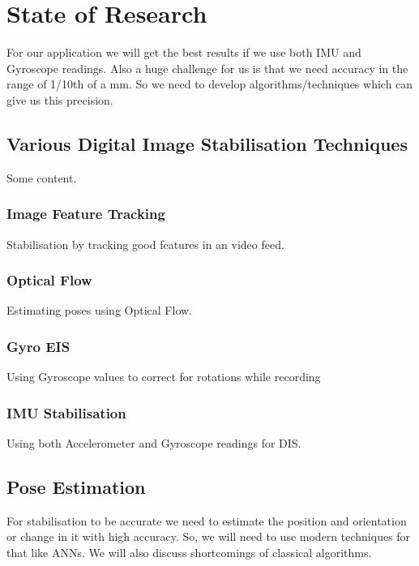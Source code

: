 \chapter{State of Research} \label{chapter_three}

For our application we will get the best results if we use both IMU and Gyroscope readings. 
Also a huge challenge for us is that we need accuracy in the range of 1/10th of a mm. So we need to develop algorithms/techniques which can give us this precision.

\section{Various Digital Image Stabilisation Techniques}

Some content.
\subsection{Image Feature Tracking}
Stabilisation by tracking good features in an video feed.

\subsection{Optical Flow}
Estimating poses using Optical Flow.

\subsection{Gyro EIS}
Using Gyroscope values to correct for rotations while recording

\subsection{IMU Stabilisation}
Using both Accelerometer and Gyroscope readings for DIS.

\section{Pose Estimation}
\label{sec:sota_pose_est}
For stabilisation to be accurate we need to estimate the position and orientation or change in it with high accuracy. So, we will need to use modern techniques for that like ANNs. We will also discuss shortcomings of classical algorithms.

